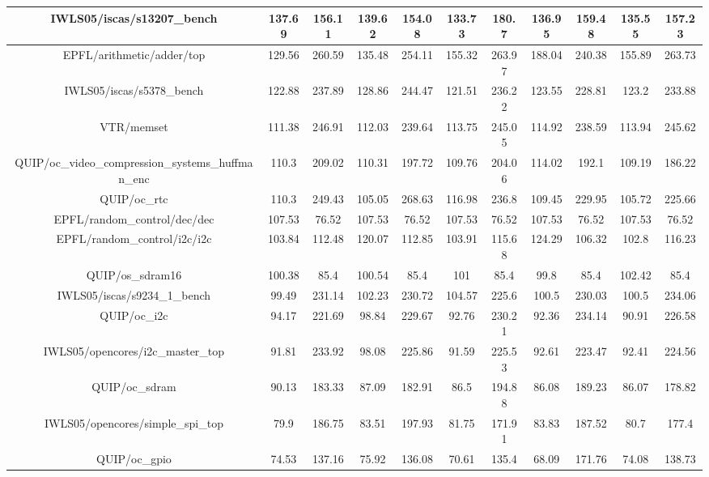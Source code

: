 {\begin{longtable}{|*{11}{c|}}
        \hline
        IWLS05/iscas/s13207\_bench & 137.69 & 156.11 & 139.62 & 154.08 & 133.73 & 180.7 & 136.95 & 159.48 & 135.55 & 157.23 \\
        \hline
        EPFL/arithmetic/adder/top & 129.56 & 260.59 & 135.48 & 254.11 & 155.32 & 263.97 & 188.04 & 240.38 & 155.89 & 263.73 \\
        \hline
        IWLS05/iscas/s5378\_bench & 122.88 & 237.89 & 128.86 & 244.47 & 121.51 & 236.22 & 123.55 & 228.81 & 123.2 & 233.88 \\
        \hline
        VTR/memset & 111.38 & 246.91 & 112.03 & 239.64 & 113.75 & 245.05 & 114.92 & 238.59 & 113.94 & 245.62 \\
        \hline
        QUIP/oc\_video\_compression\_systems\_huffman\_enc & 110.3 & 209.02 & 110.31 & 197.72 & 109.76 & 204.06 & 114.02 & 192.1 & 109.19 & 186.22 \\
        \hline
        QUIP/oc\_rtc & 110.3 & 249.43 & 105.05 & 268.63 & 116.98 & 236.8 & 109.45 & 229.95 & 105.72 & 225.66 \\
        \hline
        EPFL/random\_control/dec/dec & 107.53 & 76.52 & 107.53 & 76.52 & 107.53 & 76.52 & 107.53 & 76.52 & 107.53 & 76.52 \\
        \hline
        EPFL/random\_control/i2c/i2c & 103.84 & 112.48 & 120.07 & 112.85 & 103.91 & 115.68 & 124.29 & 106.32 & 102.8 & 116.23 \\
        \hline
        QUIP/os\_sdram16 & 100.38 & 85.4 & 100.54 & 85.4 & 101 & 85.4 & 99.8 & 85.4 & 102.42 & 85.4 \\
        \hline
        IWLS05/iscas/s9234\_1\_bench & 99.49 & 231.14 & 102.23 & 230.72 & 104.57 & 225.6 & 100.5 & 230.03 & 100.5 & 234.06 \\
        \hline
        QUIP/oc\_i2c & 94.17 & 221.69 & 98.84 & 229.67 & 92.76 & 230.21 & 92.36 & 234.14 & 90.91 & 226.58 \\
        \hline
        IWLS05/opencores/i2c\_master\_top & 91.81 & 233.92 & 98.08 & 225.86 & 91.59 & 225.53 & 92.61 & 223.47 & 92.41 & 224.56 \\
        \hline
        QUIP/oc\_sdram & 90.13 & 183.33 & 87.09 & 182.91 & 86.5 & 194.88 & 86.08 & 189.23 & 86.07 & 178.82 \\
        \hline
        IWLS05/opencores/simple\_spi\_top & 79.9 & 186.75 & 83.51 & 197.93 & 81.75 & 171.91 & 83.83 & 187.52 & 80.7 & 177.4 \\
        \hline
        QUIP/oc\_gpio & 74.53 & 137.16 & 75.92 & 136.08 & 70.61 & 135.4 & 68.09 & 171.76 & 74.08 & 138.73 \\

\end{longtable}}
